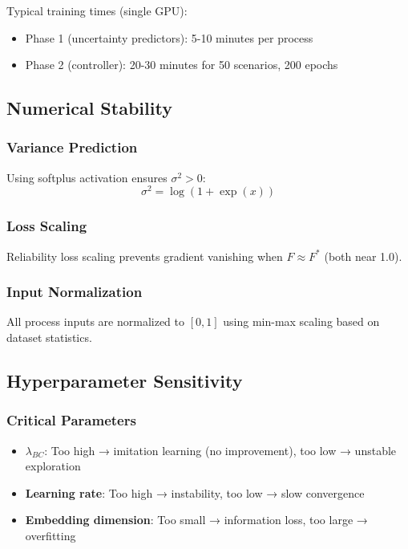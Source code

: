 \documentclass[11pt,a4paper]{article}
\begin{document}
Typical training times (single GPU):
\begin{itemize}
    \item Phase 1 (uncertainty predictors): 5-10 minutes per process
    \item Phase 2 (controller): 20-30 minutes for 50 scenarios, 200 epochs
\end{itemize}

\subsection{Numerical Stability}

\subsubsection{Variance Prediction}

Using softplus activation ensures $\sigma^2 > 0$:
$$
\sigma^2 = \log(1 + \exp(x))
$$

\subsubsection{Loss Scaling}

Reliability loss scaling prevents gradient vanishing when $F \approx F^*$ (both near 1.0).

\subsubsection{Input Normalization}

All process inputs are normalized to $[0,1]$ using min-max scaling based on dataset statistics.

\subsection{Hyperparameter Sensitivity}

\subsubsection{Critical Parameters}

\begin{itemize}
    \item \textbf{$\lambda_{BC}$}: Too high → imitation learning (no improvement), too low → unstable exploration
    \item \textbf{Learning rate}: Too high → instability, too low → slow convergence
    \item \textbf{Embedding dimension}: Too small → information loss, too large → overfitting
\end{itemize}
\end{document}
